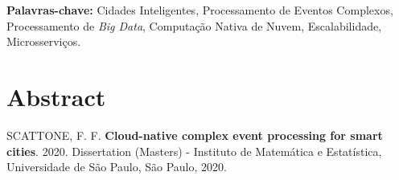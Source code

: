 \documentclass[11pt,twoside,a4paper]{book}
\begin{document}
 
 
 
 \noindent \textbf{Palavras-chave:} Cidades Inteligentes, Processamento de Eventos Complexos, Processamento de \emph{Big Data}, Computação Nativa de Nuvem, Escalabilidade, Microsserviços.

\chapter*{Abstract}
\noindent SCATTONE, F. F. \textbf{Cloud-native complex event processing for smart cities}. 
2020. 
Dissertation (Masters) - Instituto de Matemática e Estatística,
Universidade de São Paulo, São Paulo, 2020.
\\
\end{document}
